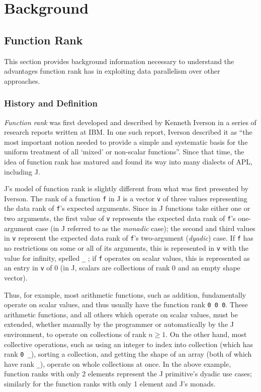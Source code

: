 \chapter{Background}
\label{back}

\section{Function Rank}
This section provides background information necessary to understand 
the advantages function rank has in exploiting data parallelism over other approaches.

\subsection{History and Definition}
\textit{Function rank} was first developed and described by Kenneth Iverson in a series of research reports written at IBM\cite{rapl}\cite{opandfunc}. 
In one such report, Iverson described it as 
``the most important notion needed to provide a simple and systematic basis for the uniform treatment of all `mixed' or non-scalar functions''\cite{rapl}. %
Since that time, the idea of function rank has matured and found its way into many dialects of APL, including J.

J's model of function rank is slightly different from what was first presented by Iverson\cite{rankanduni}\cite{jvocab}. 
The rank of a function \texttt{f} in J is a vector \texttt{v} of three values representing the data rank of \texttt{f}'s expected arguments.
Since in J functions take either one or two arguments, 
the first value of \texttt{v} represents the expected data rank of \texttt{f}'s one-argument case (in J referred to as the \textit{monadic} case);
the second and third values in \texttt{v} represent the expected data rank of \texttt{f}'s two-argument (\textit{dyadic}) case.
If \texttt{f} has no restrictions on some or all of its arguments, 
this is represented in \texttt{v} with the value for infinity, spelled \texttt{\_} ;
if \texttt{f} operates on scalar values, this is represented as an entry in \texttt{v} of 0 
(in J, scalars are collections of rank 0 and an empty shape vector). %

Thus, for example, most arithmetic functions, such as addition, 
fundamentally operate on scalar values, and thus usually have the function rank \texttt{0 0 0}.
These arithmetic functions, and all others which operate on scalar values, 
must be extended, whether manually by the programmer or automatically by the J environment, 
to operate on collections of rank $n \ge 1$.
On the other hand, most collective operations, such as using an integer to index into collection (which has rank \texttt{0 \_}), 
sorting a collection, and getting the shape of an array (both of which have rank \texttt{\_}), operate on whole collections at once.
In the above example, function ranks with only 2 elements represent the J primitive's dyadic use cases; 
similarly for the function ranks with only 1 element and J's monads. %

